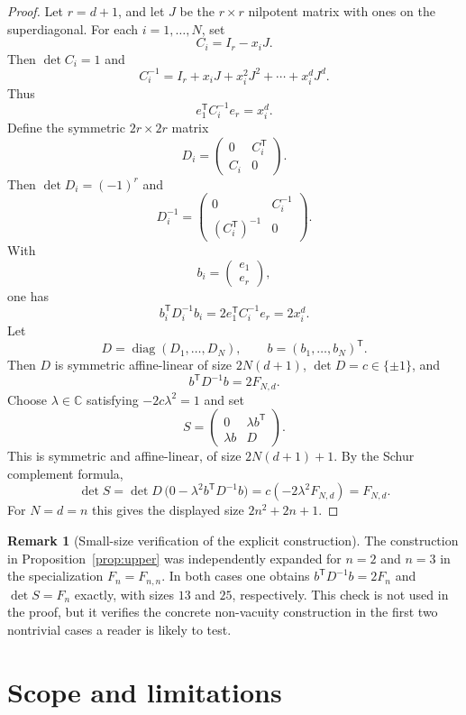 \documentclass[11pt]{article}
\theoremstyle{plain}
\theoremstyle{definition}
\newtheorem{remark}{Remark}
\newcommand{\CC}{\mathbb{C}}
\begin{document}
\begin{proof}
Let $r=d+1$, and let $J$ be the $r\times r$ nilpotent matrix with ones on the
superdiagonal.  For each $i=1,\ldots,N$, set
\[
  C_i=I_r-x_iJ.
\]
Then $\det C_i=1$ and
\[
  C_i^{-1}=I_r+x_iJ+x_i^2J^2+\cdots+x_i^dJ^d.
\]
Thus
\[
  e_1^{\mathsf T}C_i^{-1}e_r=x_i^d.
\]
Define the symmetric $2r\times2r$ matrix
\[
  D_i=\begin{pmatrix}0&C_i^{\mathsf T}\\ C_i&0\end{pmatrix}.
\]
Then $\det D_i=(-1)^r$ and
\[
  D_i^{-1}=\begin{pmatrix}0&C_i^{-1}\\ (C_i^{\mathsf T})^{-1}&0\end{pmatrix}.
\]
With
\[
  b_i=\begin{pmatrix}e_1\\ e_r\end{pmatrix},
\]
one has
\[
  b_i^{\mathsf T}D_i^{-1}b_i
  =2e_1^{\mathsf T}C_i^{-1}e_r
  =2x_i^d.
\]
Let
\[
  D=\operatorname{diag}(D_1,\ldots,D_N),
  \qquad
  b=(b_1,\ldots,b_N)^{\mathsf T}.
\]
Then $D$ is symmetric affine-linear of size $2N(d+1)$,
$\det D=c\in\{\pm1\}$, and
\[
  b^{\mathsf T}D^{-1}b=2F_{N,d}.
\]
Choose $\lambda\in\CC$ satisfying $-2c\lambda^2=1$ and set
\[
  S=\begin{pmatrix}0&\lambda b^{\mathsf T}\\ \lambda b&D\end{pmatrix}.
\]
This is symmetric and affine-linear, of size $2N(d+1)+1$.  By the Schur
complement formula,
\[
  \det S
  =\det D\,\big(0-\lambda^2 b^{\mathsf T}D^{-1}b\big)
  =c(-2\lambda^2F_{N,d})=F_{N,d}.
\]
For $N=d=n$ this gives the displayed size $2n^2+2n+1$.
\end{proof}

\begin{remark}[Small-size verification of the explicit construction]
\label{rem:smallchecks}
The construction in Proposition~\ref{prop:upper} was independently expanded for
$n=2$ and $n=3$ in the specialization $F_n=F_{n,n}$.  In both cases one obtains
$b^{\mathsf T}D^{-1}b=2F_n$ and $\det S=F_n$ exactly, with sizes $13$ and $25$,
respectively.  This check is not used in the proof, but it verifies the concrete
non-vacuity construction in the first two nontrivial cases a reader is likely to
test.
\end{remark}

\section{Scope and limitations}
\label{sec:scope}
\end{document}
